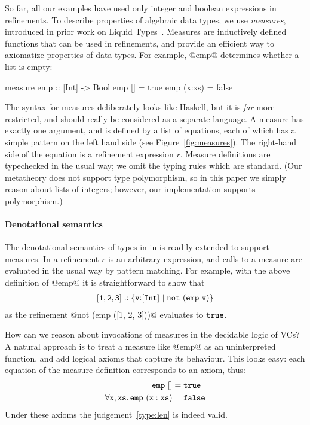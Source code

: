 So far, all our examples have used only integer and boolean expressions in refinements.
To describe properties of algebraic data types, we use \emph{measures},
introduced in prior work on Liquid Types~\cite{LiquidPLDI09}.
Measures are inductively defined functions that can be used in refinements, and
provide an efficient way to axiomatize properties of data types.
%
For example, @emp@ determines whether a list is empty:
%
\begin{code}
  measure emp  :: [Int] -> Bool
    emp []     = true
    emp (x:xs) = false
\end{code}
The syntax for measures deliberately looks like Haskell, but it is \emph{far} more
restricted, and should really be considered as a separate language.
A measure has exactly one argument, and is defined by a list of equations,
each of which has a simple pattern on the left hand side (see Figure~\ref{fig:measures}).
The right-hand side of the equation is a refinement expression $r$.
Measure definitions are typechecked in the usual way; we omit the typing rules which are standard.
(Our metatheory does not support type polymorphism,
so in this paper we simply reason about lists of integers;
however, our implementation supports polymorphism.)

\paragraph{Denotational semantics}
The denotational semantics of types in \hlang in  is readily extended to
support measures.  In \hlang a refinement $r$ is an arbitrary expression, and
calls to a measure are evaluated in the usual way by pattern matching.
For example, with the above definition of @emp@ it is straightforward to show that
\begin{align}
  \mathtt{[1, 2, 3]} \dcolon \tref{\mathtt{v}}{[\tint]}{}{\mathtt{not}\ (\mathtt{emp}\ \mathtt{v})} \label{type:len}
\end{align}
as the refinement @not (emp ([1, 2, 3]))@ evaluates to $\mathtt{true}$.

How can we reason about invocations of measures in the decidable logic of VCs?
A natural approach is to treat a measure like @emp@ as an uninterpreted function,
and add logical axioms that capture its behaviour. This looks easy: each equation 
of the measure definition corresponds to an axiom, thus:
%
\begin{align*}
\mathtt{emp}\ \text{[]} &= \mathtt{true}\\
\forall \mathtt{x}, \mathtt{xs}.\, \mathtt{emp}\ (\mathtt{x}:\mathtt{xs}) &= \mathtt{false}
\end{align*}
%
Under these axioms the judgement~\ref{type:len} is indeed valid. 

